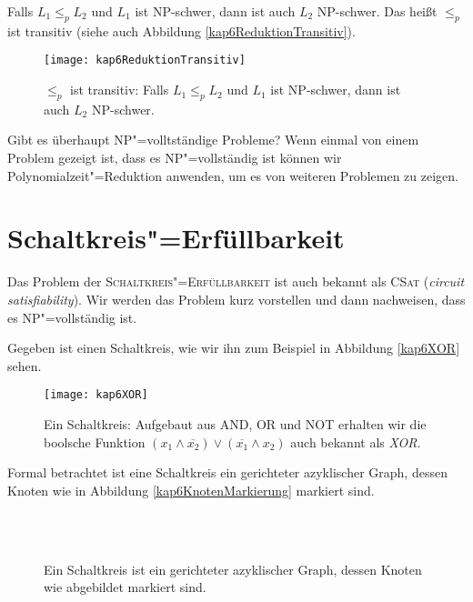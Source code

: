 \begin{Anm}\label{transitiveReduktion}
  \hspace{\parindent}Falls $L_1 \le_p L_2$ und $L_1$ ist \textsf{NP}-schwer, dann ist auch $L_2$ \textsf{NP}-schwer. Das heißt $\le_p$ ist transitiv (siehe auch Abbildung \vref{kap6ReduktionTransitiv}).
\end{Anm}

\begin{figure}[htb]
  \centering
  \texttt{[image: kap6ReduktionTransitiv]}
  \caption{$\le_p$ ist transitiv: Falls $L_1 \le_p L_2$ und $L_1$ ist \textsf{NP}-schwer, dann ist auch $L_2$ \textsf{NP}-schwer.}
  \label{kap6ReduktionTransitiv}
\end{figure}

Gibt es überhaupt \textsf{NP}"=volltständige Probleme? Wenn einmal von einem Problem gezeigt ist, dass es \textsf{NP}"=vollständig ist können wir Polynomialzeit"=Reduktion anwenden, um es von weiteren Problemen zu zeigen.

\section{Schaltkreis"=Erfüllbarkeit}
Das Problem der \textsc{Schaltkreis"=Erfüllbarkeit} ist auch bekannt als \textsc{CSat} (\textit{circuit satisfiability}). Wir werden das Problem kurz vorstellen und dann nachweisen, dass es \textsf{NP}"=vollständig ist.

Gegeben ist einen Schaltkreis, wie wir ihn zum Beispiel in Abbildung \vref{kap6XOR} sehen.

\begin{figure}[htb]
  \centering
  \texttt{[image: kap6XOR]}
  \caption{Ein Schaltkreis: Aufgebaut aus AND, OR und NOT erhalten wir die boolsche Funktion $(x_1 \wedge \overline{x_2}) \vee (\overline{x_1} \wedge x_2)$ auch bekannt als \textit{XOR}.}
  \label{kap6XOR}
\end{figure}

Formal betrachtet ist eine Schaltkreis ein gerichteter azyklischer Graph, dessen Knoten wie in Abbildung \vref{kap6KnotenMarkierung} markiert sind.
\begin{figure}[htb]
  \centering
  \\
  \\
  \caption{Ein Schaltkreis ist ein gerichteter azyklischer Graph, dessen Knoten wie abgebildet markiert sind.}
  \label{kap6KnotenMarkierung}
\end{figure}

